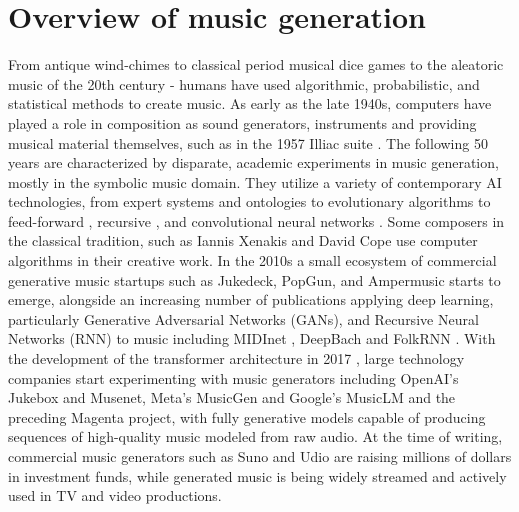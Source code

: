 \section{Overview of music generation} \label{section:music_generation_overview}
From antique wind-chimes to classical period musical dice games to the aleatoric music of the 20th century - humans have used algorithmic, probabilistic, and statistical methods to create music. As early as the late 1940s, computers have played a role in composition as sound generators, instruments \cite{France-Presse_2016} and providing musical material themselves, such as in the 1957 Illiac suite \cite{Hiller_Isaacson_1959}. The following 50 years are characterized by disparate, academic experiments in music generation, mostly in the symbolic music domain. They utilize a variety of contemporary AI technologies, from expert systems and ontologies \cite{Hiller_Isaacson_1959}\cite{Ebcioğlu_1994} to evolutionary algorithms \cite{Polito_Daida_Bersano-Begey_1997} to feed-forward \cite{Todd_1989}, recursive \cite{Mozer_1994}, and convolutional neural networks \cite{coconet}. Some composers in the classical tradition, such as Iannis Xenakis \cite{Xenakis_1992} and David Cope\cite{Cope_1989} use computer algorithms in their creative work. 
In the 2010s a small ecosystem of commercial generative music startups such as Jukedeck, PopGun, and Ampermusic \cite{Featherstone_2017} starts to emerge, alongside an increasing number of publications applying deep learning, particularly Generative Adversarial Networks (GANs), and Recursive Neural Networks (RNN) to music including MIDInet \cite{midinet}, DeepBach \cite{Hadjeres_Pachet_Nielsen_2017} and FolkRNN \cite{Sturm_Ben-Tal_2016}. With the development of the transformer architecture in 2017 \cite{Vaswani_Shazeer_Parmar_Uszkoreit_Jones_Gomez_Kaiser_Polosukhin_2017}, large technology companies start experimenting with music generators including OpenAI’s Jukebox \cite{Dhariwal_Jun_Payne_Kim_Radford_Sutskever_2020} and Musenet\cite{Christine_2019}, Meta’s MusicGen\cite{copet2023simple} and Google’s MusicLM \cite{Agostinelli_Denk_Borsos_Engel_Verzetti_Caillon_Huang_Jansen_Roberts_Tagliasacchi_et_al._2023} and the preceding Magenta project, with fully generative models capable of producing sequences of high-quality music modeled from raw audio. At the time of writing, commercial music generators such as Suno and Udio are raising millions of dollars in investment funds\cite{Stassen_2024}, while generated music is being widely streamed and actively used in TV and video productions. 

